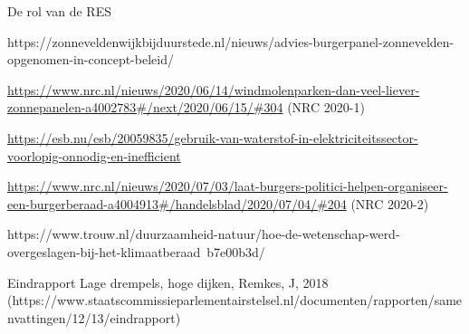 \begin{voorstel}{De rol van de RES}
\begin{multicols*}{2}
https://zonneveldenwijkbijduurstede.nl/nieuws/advies-burgerpanel-zonnevelden-opgenomen-in-concept-beleid/

\url{https://www.nrc.nl/nieuws/2020/06/14/windmolenparken-dan-veel-liever-zonnepanelen-a4002783#/next/2020/06/15/#304} (NRC 2020-1)

\url{https://esb.nu/esb/20059835/gebruik-van-waterstof-in-elektriciteitssector-voorlopig-onnodig-en-inefficient}

\url{https://www.nrc.nl/nieuws/2020/07/03/laat-burgers-politici-helpen-organiseer-een-burgerberaad-a4004913#/handelsblad/2020/07/04/#204} (NRC 2020-2)

https://www.trouw.nl/duurzaamheid-natuur/hoe-de-wetenschap-werd-overgeslagen-bij-het-klimaatberaad~b7e00b3d/

Eindrapport Lage drempels, hoge dijken, Remkes, J, 2018 (https://www.staatscommissieparlementairstelsel.nl/documenten/rapporten/samenvattingen/12/13/eindrapport)

\end{multicols*}

\end{voorstel}
